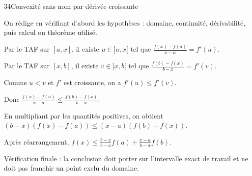 \documentclass[11pt,a4paper]{article}
\begin{document}
\begin{corrbox}{34}{Convexité sans nom par dérivée croissante}

\begin{methodebox}
On rédige en vérifiant d'abord les hypothèses : domaine, continuité, dérivabilité, puis calcul ou théorème utilisé.
\end{methodebox}

Par le TAF sur $[a,x]$, il existe $u\in]a,x[$ tel que $\frac{f(x)-f(a)}{x-a}=f'(u)$.


Par le TAF sur $[x,b]$, il existe $v\in]x,b[$ tel que $\frac{f(b)-f(x)}{b-x}=f'(v)$.


Comme $u<v$ et $f'$ est croissante, on a $f'(u)\le f'(v)$.


Donc $\frac{f(x)-f(a)}{x-a}\le \frac{f(b)-f(x)}{b-x}$.


En multipliant par les quantités positives, on obtient $(b-x)(f(x)-f(a))\le(x-a)(f(b)-f(x))$.


Après réarrangement, $f(x)\le \frac{b-x}{b-a}f(a)+\frac{x-a}{b-a}f(b)$.


\begin{attentionbox}
Vérification finale : la conclusion doit porter sur l'intervalle exact de travail et ne doit pas franchir un point exclu du domaine.
\end{attentionbox}

\end{corrbox}
\end{document}
